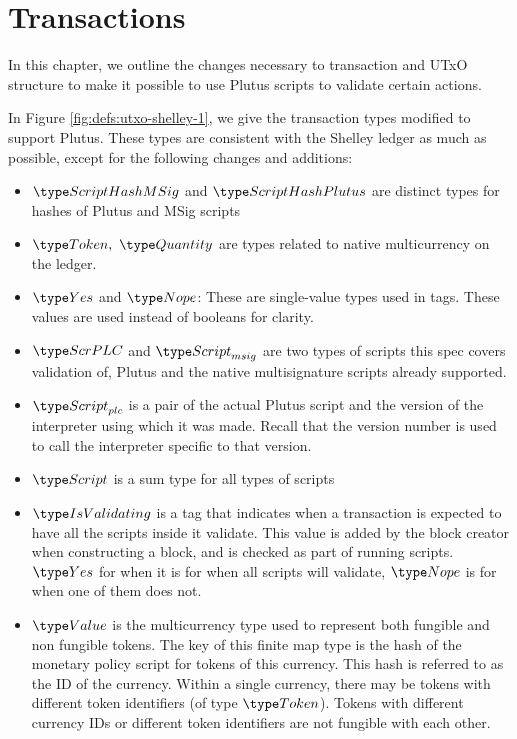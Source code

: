 \section{Transactions}
\label{sec:transactions}

In this chapter, we outline the changes necessary to transaction and
UTxO structure to make it possible to use Plutus scripts to validate
certain actions.

In Figure \ref{fig:defs:utxo-shelley-1}, we give the transaction types modified
to support Plutus. These types are consistent with the Shelley ledger
as much as possible,
except for the following changes and additions:

\begin{itemize}
  \item $\ScriptHashMSig$ and $\ScriptHashPlutus$ are distinct types for hashes
  of Plutus and MSig scripts

  \item $\Token,~\Quantity$ are types
  related to native multicurrency on the ledger.

  \item $\Yes$ and $\Nope$: These are single-value types used in tags. These
  values are used instead of booleans for clarity.

  \item $\ScrPLC$ and $\ScriptMSig$ are two types of scripts this spec
  covers validation of, Plutus and the native multisignature scripts already supported.

  \item $\ScriptPlutus$ is a pair of the actual Plutus script and the version of the
  interpreter using which it was made. Recall that the version number is
  used to call the interpreter specific to that version.

  \item $\Script$ is a sum type for all types of scripts

  \item $\IsValidating$ is a tag that indicates when a transaction is
  expected to have all the scripts inside it validate.
  This value is added by the block creator when
  constructing a block, and is checked as part of running scripts.
  $\Yes$ for when it is for when all scripts will validate,
  $\Nope$ is for when one of them does not.

  \item $\Value$ is the multicurrency type used to represent
  both fungible and non fungible tokens. The key of this finite map type is
  the hash of the monetary policy script for tokens of this currency.
  This hash is referred to as the ID of the currency. Within a single
  currency, there may be tokens with different token identifiers
  (of type $\Token$). Tokens with different currency IDs
  or different token identifiers are not fungible with each other.


\end{itemize}
